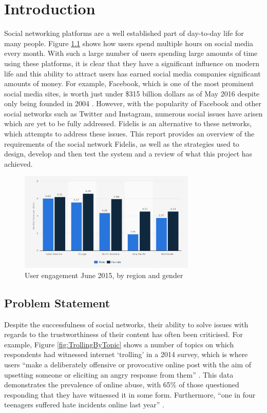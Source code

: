 \chapter{Introduction}
\label{Chapter:Introduction}

Social networking platforms are a well established part of day-to-day life for many people. Figure \ref{fig:SocialMediaRegionGender} shows how users spend multiple hours on social media every month. With such a large number of users spending large amounts of time using these platforms, it is clear that they have a significant influence on modern life and this ability to attract users has earned social media companies significant amounts of money. For example, Facebook, which is one of the most prominent social media sites, is worth just under \$315 billion dollars as of May 2016 despite only being founded in 2004 \cite{Forbes:Facebook}. However, with the popularity of Facebook and other social networks such as Twitter and Instagram, numerous social issues have arisen which are yet to be fully addressed. Fidelis is an alternative to these networks, which attempts to address these issues. This report provides an overview of the requirements of the social network Fidelis, as well as the strategies used to design, develop and then test the system and a review of what this project has achieved.

\begin{figure}[H]
  \centering
  \includegraphics[width=0.75\textwidth]{Images/Introduction/SocialMediaRegionGender}
  \caption{User engagement June 2015, by region and gender \cite{Statista:SocialMediaRegionGender}} \label{fig:SocialMediaRegionGender} 
\end{figure}


\section{Problem Statement}
\label{Section:ProblemStatement}
Despite the successfulness of social networks, their ability to solve issues with regards to the trustworthiness of their content has often been criticised. For example, Figure \ref{fig:TrollingByTopic} shows a number of topics on which respondents had witnessed internet `trolling' in a 2014 survey, which is where users ``make a deliberately offensive or provocative online post with the aim of upsetting someone or eliciting an angry response from them'' \cite{Oxford:Trolling}. This data demonstrates the prevalence of online abuse, with 65\% of those questioned responding that they have witnessed it in some form. Furthermore, ``one in four teenagers suffered hate incidents online last year'' \cite{Gani:Trolling}.

